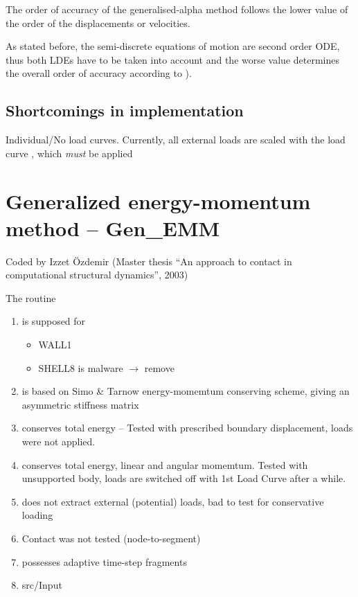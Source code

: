 The order of accuracy of the generalised-alpha method follows the lower value of the order of the displacements or velocities.

As stated before, the semi-discrete equations of motion are second order ODE, thus both LDEs have to be taken into account and the worse value determines the overall order of accuracy according to  \etal{} \cite{strdyn:hairer87, strdyn:hairer91}). 

\subsection{Shortcomings in \ccarat{} implementation}
Individual/No load curves. Currently, all external loads are scaled with
  the load curve , which \emph{must} be applied


\section{Generalized energy-momentum method -- \ccarat{} Gen\_EMM}
Coded by Izzet \"{O}zdemir (Master thesis ``An approach to contact in
computational structural dynamics'', 2003)

The routine
\begin{enumerate}
\item is supposed for
  \begin{itemize}
  \item WALL1
  \item SHELL8 is malware $\to$ remove
  \end{itemize}
\item is based on Simo \& Tarnow energy-momemtum conserving scheme, giving
  an asymmetric stiffness matrix 
\item conserves total energy -- Tested with
  prescribed boundary displacement, loads were not applied.
\item conserves total energy, linear and angular momemtum. Tested with
  unsupported body, loads are switched off with 1st Load Curve after a while. 
\item does not extract external (potential) loads, bad to test for
  conservative loading 
\item Contact was not tested (node-to-segment)
\item possesses adaptive time-step fragments
\item src/Input 
\end{enumerate}

